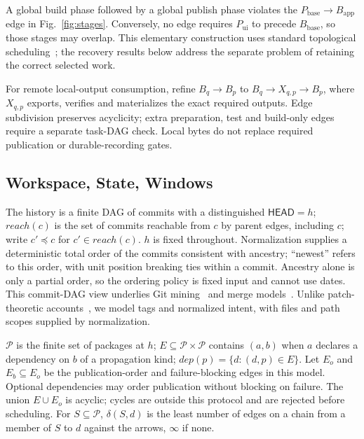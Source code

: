 A global build phase followed by a global publish phase violates the
$P_{\mathrm{base}}\to B_{\mathrm{app}}$ edge in Fig.~\ref{fig:stages}.
Conversely, no edge requires $P_{\mathrm{ui}}$ to precede
$B_{\mathrm{base}}$, so those stages may overlap. This elementary construction
uses standard topological scheduling~\cite{kahn,mokhov}; the recovery results
below address the separate problem of retaining the correct selected work.

For remote local-output consumption, refine $B_q\to B_p$ to
$B_q\to X_{q,p}\to B_p$, where $X_{q,p}$ exports, verifies and materializes
the exact required outputs. Edge subdivision preserves acyclicity; extra
preparation, test and build-only edges require a separate task-DAG check.
Local bytes do not replace required publication or durable-recording gates.

\subsection{Workspace, State, Windows}

\begin{definition}[history]
The history is a finite DAG of commits with a distinguished
$\mathsf{HEAD} = h$; $\mathit{reach}(c)$ is the set of commits reachable
from $c$ by parent edges, including $c$; write $c' \preceq c$ for
$c' \in \mathit{reach}(c)$. $h$ is fixed throughout. Normalization supplies a deterministic total order
of the commits consistent with ancestry; ``newest'' refers to this order,
with unit position breaking ties within a commit. Ancestry alone is only a
partial order, so the ordering policy is fixed input and cannot use dates.
This commit-DAG view underlies Git mining~\cite{birdgit} and merge
models~\cite{mrdt}. Unlike patch-theoretic accounts~\cite{swierstraloh,hpt,mimram},
we model tags and normalized intent, with files and path scopes supplied by
normalization.
\end{definition}

\begin{definition}[workspace]
$\mathcal{P}$ is the finite set of packages at $h$; $E \subseteq
\mathcal{P} \times \mathcal{P}$ contains $(a,b)$ when $a$ declares a
dependency on $b$ of a propagation kind; $\mathit{dep}(p) = \{d : (d,p)
\in E\}$. Let $E_o$ and $E_b\subseteq E_o$ be the publication-order and
failure-blocking edges in this model. Optional dependencies may order publication without
blocking on failure. The union $E\cup E_o$ is acyclic; cycles are outside this protocol
and are rejected before scheduling. For $S \subseteq
\mathcal{P}$, $\delta(S,d)$ is the least number of edges on a chain from
a member of $S$ to $d$ against the arrows, $\infty$ if none.
\end{definition}

